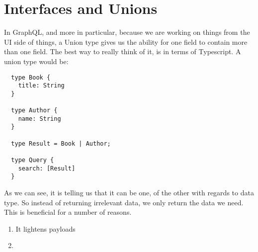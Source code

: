 \maketitle{}
\section{ Interfaces and Unions }

In GraphQL, and more in particular, because we are working on things from the
UI side of things, a Union type gives us the ability for one field to contain
more than one field. The best way to really think of it, is in terms of
Typescript. A union type would be:
\begin{lstlisting}
  type Book {
    title: String
  }

  type Author {
    name: String
  }

  type Result = Book | Author;

  type Query {
    search: [Result]
  }
\end{lstlisting}

As we can see, it is telling us that it can be one, of the other with regards
to data type. So instead of returning irrelevant data, we only return the data
we need. This is beneficial for a number of reasons.
\begin{enumerate}
  \item It lightens payloads
  \item 
\end{enumerate}
